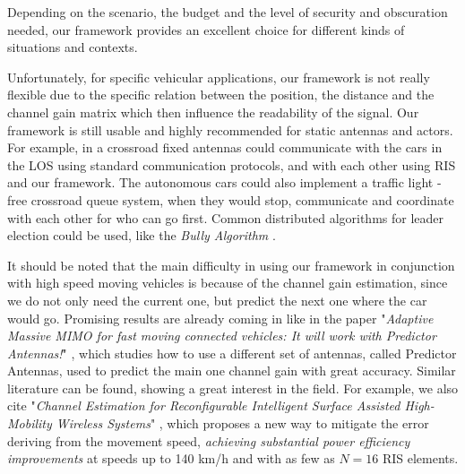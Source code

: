 Depending on the scenario, the budget and the level of security and obscuration needed, our framework provides an excellent choice for different kinds of situations and contexts.

Unfortunately, for specific vehicular applications, our framework is not really flexible due to the specific relation between the position, the distance and the channel gain matrix which then influence the readability of the signal. Our framework is still usable and highly recommended for static antennas and actors. For example, in a crossroad fixed antennas could communicate with the cars in the LOS using standard communication protocols, and with each other using RIS and our framework. The autonomous cars could also implement a traffic light - free crossroad queue system, when they would stop, communicate and coordinate with each other for who can go first. Common distributed algorithms for leader election could be used, like the \textit{Bully Algorithm} \cite{Bully_algorithm}.

It should be noted that the main difficulty in using our framework in conjunction with high speed moving vehicles is because of the channel gain estimation, since we do not only need the current one, but predict the next one where the car would go. Promising results are already coming in like in the paper "\textit{Adaptive Massive MIMO for fast moving connected vehicles: It will work with Predictor Antennas!}" \cite{8385489}, which studies how to use a different set of antennas, called Predictor Antennas, used to predict the main one channel gain with great accuracy. Similar literature can be found, showing a great interest in the field. For example, we also cite "\textit{Channel Estimation for Reconfigurable Intelligent Surface Assisted High-Mobility Wireless Systems}" \cite{9875062}, which proposes a new way to mitigate the error deriving from the movement speed, \textit{achieving substantial power efficiency improvements} at speeds up to 140 km/h and with as few as $N=16$ RIS elements.